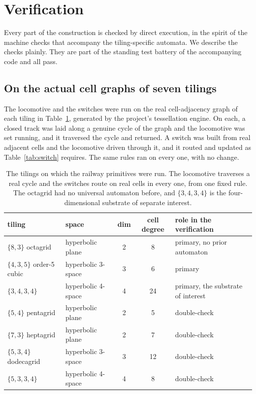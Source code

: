 \section{Verification}
\label{sec:verification}

Every part of the construction is checked by direct execution, in the spirit of the machine checks that
accompany the tiling-specific automata. We describe the checks plainly. They are part of the standing test
battery of the accompanying code \cite{pollard2026vibe} and all pass.

\subsection{On the actual cell graphs of seven tilings}

The locomotive and the switches were run on the real cell-adjacency graph of each tiling in
Table~\ref{tab:tilings}, generated by the project's tessellation engine. On each, a closed track was laid along
a genuine cycle of the graph and the locomotive was set running, and it traversed the cycle and returned. A
switch was built from real adjacent cells and the locomotive driven through it, and it routed and updated as
Table~\ref{tab:switch} requires. The same rules ran on every one, with no change.

\begin{table}[ht]
\centering
\begin{tabular}{@{}llccl@{}}
\toprule
tiling & space & dim & cell degree & role in the verification \\
\midrule
$\{8,3\}$ octagrid & hyperbolic plane & 2 & 8 & primary, no prior automaton \\
$\{4,3,5\}$ order-5 cubic & hyperbolic 3-space & 3 & 6 & primary \\
$\{3,4,3,4\}$ & hyperbolic 4-space & 4 & 24 & primary, the substrate of interest \\
$\{5,4\}$ pentagrid & hyperbolic plane & 2 & 5 & double-check \\
$\{7,3\}$ heptagrid & hyperbolic plane & 2 & 7 & double-check \\
$\{5,3,4\}$ dodecagrid & hyperbolic 3-space & 3 & 12 & double-check \\
$\{5,3,3,4\}$ & hyperbolic 4-space & 4 & 8 & double-check \\
\bottomrule
\end{tabular}
\caption{The tilings on which the railway primitives were run. The locomotive traverses a real cycle and the
switches route on real cells in every one, from one fixed rule. The octagrid had no universal automaton before,
and $\{3,4,3,4\}$ is the four-dimensional substrate of separate interest.}
\label{tab:tilings}
\end{table}

